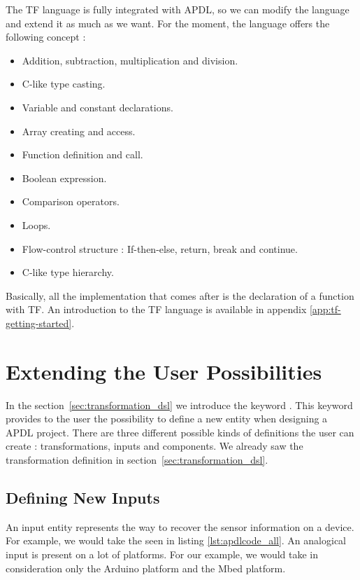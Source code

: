 The \gls{TF} language is fully integrated with \gls{APDL}, so we can modify the
language and extend it as much as we want. For the moment, the language offers
the following concept :

\begin{itemize}
\item Addition, subtraction, multiplication and division.
\item C-like type casting.
\item Variable and constant declarations.
\item Array creating and access.
\item Function definition and call.
\item Boolean expression.
\item Comparison operators.
\item Loops.
\item Flow-control structure : If-then-else, return, break and continue.
\item C-like type hierarchy.
\end{itemize}

Basically, all the implementation that comes after 
is the declaration of a function with \gls{TF}. An introduction to the \gls{TF}
language is available in appendix \ref{app:tf-getting-started}.

\section{Extending the User Possibilities}
\label{sec:extending_user_possibilities}

In the section~\ref{sec:transformation_dsl} we introduce the keyword
. This keyword provides to the user the possibility to define
a new entity when designing a \gls{APDL} project. There are three different
possible kinds of definitions the user can create : transformations, inputs and
components. We already saw the transformation definition in
section~\ref{sec:transformation_dsl}.

\subsection{Defining New Inputs}
\label{sec:defining_new_input}

An input entity represents the way to recover the sensor information on a
device. For example, we would take the  seen in
listing \ref{lst:apdlcode_all}. An analogical input is present on a lot of
platforms. For our example, we would take in consideration only the Arduino
platform\cite{ArduinoSoftware2017} and the Mbed platform\cite{ARMmbed}.

